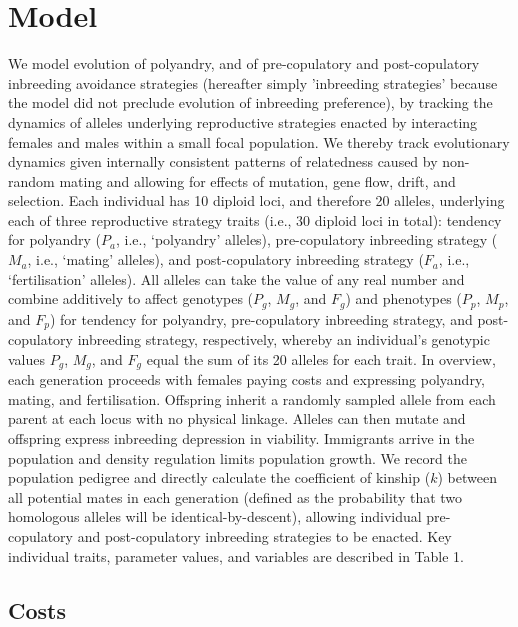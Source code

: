 \documentclass[12pt]{article}
\begin{document}
\section*{Model}

We model evolution of polyandry, and of pre-copulatory and post-copulatory inbreeding avoidance strategies (hereafter simply 'inbreeding strategies' because the model did not preclude evolution of inbreeding preference), by tracking the dynamics of alleles underlying reproductive strategies enacted by interacting females and males within a small focal population. We thereby track evolutionary dynamics given internally consistent patterns of relatedness caused by non-random mating and allowing for effects of mutation, gene flow, drift, and selection. Each individual has 10 diploid loci, and therefore 20 alleles, underlying each of three reproductive strategy traits (i.e., 30 diploid loci in total): tendency for polyandry ($P_{a}$, i.e., `polyandry' alleles), pre-copulatory inbreeding strategy ($M_{a}$, i.e., `mating' alleles), and post-copulatory inbreeding strategy ($F_{a}$, i.e., `fertilisation' alleles). All alleles can take the value of any real number \cite[i.e., a continuum-of-alleles model;][]{Kimura1965, Lande1976, Reeve2000, Bocedi2014} and combine additively to affect genotypes ($P_{g}$, $M_{g}$, and $F_{g}$) and phenotypes ($P_{p}$, $M_{p}$, and $F_{p}$) for tendency for polyandry, pre-copulatory inbreeding strategy, and post-copulatory inbreeding strategy, respectively, whereby an individual's genotypic values $P_{g}$, $M_{g}$, and $F_{g}$ equal the sum of its 20 alleles for each trait. In overview, each generation proceeds with females paying costs and expressing polyandry, mating, and fertilisation. Offspring inherit a randomly sampled allele from each parent at each locus with no physical linkage. Alleles can then mutate and offspring express inbreeding depression in viability. Immigrants arrive in the population and density regulation limits population growth. We record the population pedigree and directly calculate the coefficient of kinship ($k$) between all potential mates in each generation (defined as the probability that two homologous alleles will be identical-by-descent), allowing individual pre-copulatory and post-copulatory inbreeding strategies to be enacted. Key individual traits, parameter values, and variables are described in Table 1.

\subsection*{Costs}
\end{document}
